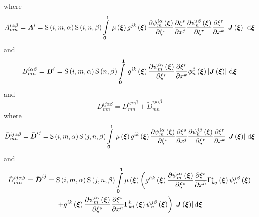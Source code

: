 where
\begin{equation}
  A^{i\alpha\beta}_{mn}=\matr{A}^{i}=\idxgsf{i}{m}{\alpha}\idxgsf{i}{n}{\beta}\gint{\vectr{0}}{\vectr{1}}{
      \fnof{\mu}{\vectr{\xi}}\fnof{g^{jk}}{\vectr{\xi}}\delby{\idxgbfn{i}{m}{\alpha}{\vectr{\xi}}}{\xi^{s}}
      \delby{\xi^{s}}{x^{j}}\delby{\idxgbfn{i}{n}{\beta}{\vectr{\xi}}}{\xi^{r}}\delby{\xi^{r}}{x^{k}}
      \abs{\fnof{\matr{J}}{\vectr{\xi}}}}{\vectr{\xi}}
\end{equation}
and
\begin{equation}
  B^{i\alpha\beta}_{mn}=\matr{B}^{i}=\idxgsf{i}{m}{\alpha}\gsf{n}{\beta}\gint{\vectr{0}}{\vectr{1}}{
      \fnof{g^{ik}}{\vectr{\xi}}\delby{\idxgbfn{i}{m}{\alpha}{\vectr{\xi}}}{\xi^{r}}\delby{\xi^{r}}{x^{k}}
      \altgbfn{n}{\beta}{\vectr{\xi}}\abs{\fnof{\matr{J}}{\vectr{\xi}}}}{\vectr{\xi}}
\end{equation}
and
\begin{equation}
  D^{ij\alpha\beta}_{mn}=\bar{D}^{ij\alpha\beta}_{mn}+\tilde{D}^{ij\alpha\beta}_{mn}
\end{equation}
where
\begin{equation}
  \bar{D}^{ij\alpha\beta}_{mn}=\bar{\matr{D}}^{ij}=\idxgsf{i}{m}{\alpha}\idxgsf{j}{n}{\beta}
  \gint{\vectr{0}}{\vectr{1}}{\fnof{\mu}{\vectr{\xi}}\fnof{g^{ik}}{\vectr{\xi}}\delby{\idxgbfn{i}{m}{\alpha}{\vectr{\xi}}}{\xi^{s}}
    \delby{\xi^{s}}{x^{j}}\delby{\idxgbfn{j}{n}{\beta}{\vectr{\xi}}}{\xi^{r}}\delby{\xi^{r}}{x^{k}}
    \abs{\fnof{\matr{J}}{\vectr{\xi}}}}{\vectr{\xi}}
\end{equation}
and
\begin{multline}
  \tilde{D}^{ij\alpha\beta}_{mn}=\tilde{\matr{D}}^{ij}=\idxgsf{i}{m}{\alpha}\idxgsf{j}{n}{\beta}
    \dintl{\vectr{0}}{\vectr{1}}\fnof{\mu}{\vectr{\xi}}\left(\fnof{g^{hk}}{\vectr{\xi}}
      \delby{\idxgbfn{i}{m}{\alpha}{\vectr{\xi}}}{\xi^{s}}\delby{\xi^{s}}{x^{h}}
      \fnof{\christoffel{i}{k}{j}}{\vectr{\xi}}\idxgbfn{j}{n}{\beta}{\vectr{\xi}}\right.\\
      \left.+\fnof{g^{ik}}{\vectr{\xi}}
      \delby{\idxgbfn{i}{m}{\alpha}{\vectr{\xi}}}{\xi^{s}}\delby{\xi^{s}}{x^{h}}
      \fnof{\christoffel{h}{k}{j}}{\vectr{\xi}}\idxgbfn{j}{n}{\beta}{\vectr{\xi}}\right)   
    \abs{\fnof{\matr{J}}{\vectr{\xi}}}\exteriorderiv{\vectr{\xi}}
\end{multline}

